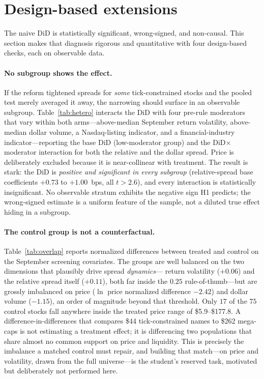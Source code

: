\documentclass[12pt]{article}
\begin{document}
\section{Design-based extensions}\label{sec:design}
The naive DiD is statistically significant, wrong-signed, and non-causal. This section makes
that diagnosis rigorous and quantitative with four design-based checks, each on observable data.

\paragraph{No subgroup shows the effect.} If the reform tightened spreads for \emph{some}
tick-constrained stocks and the pooled test merely averaged it away, the narrowing should
surface in an observable subgroup. Table~\ref{tab:hetero} interacts the DiD with four pre-rule
moderators that vary within both arms---above-median September return volatility, above-median
dollar volume, a Nasdaq-listing indicator, and a financial-industry indicator---reporting the
base DiD (low-moderator group) and the DiD$\times$moderator interaction for both the relative
and the dollar spread. Price is deliberately excluded because it is near-collinear with
treatment. The result is stark: the DiD is \emph{positive and significant in every subgroup}
(relative-spread base coefficients $+0.73$ to $+1.00$~bps, all $t>2.6$), and every interaction
is statistically insignificant. No observable stratum exhibits the negative sign H1 predicts;
the wrong-signed estimate is a uniform feature of the sample, not a diluted true effect hiding
in a subgroup.

\paragraph{The control group is not a counterfactual.} Table~\ref{tab:overlap} reports
normalized differences between treated and control on the September screening covariates. The
groups are well balanced on the two dimensions that plausibly drive spread \emph{dynamics}---
return volatility ($+0.06$) and the relative spread itself ($+0.11$), both far inside the
$0.25$ rule-of-thumb---but are grossly imbalanced on price ($\ln$ price normalized difference
$-2.42$) and dollar volume ($-1.15$), an order of magnitude beyond that threshold. Only $17$ of
the $75$ control stocks fall anywhere inside the treated price range of \$5.9--\$177.8. A
difference-in-differences that compares \$44 tick-constrained names to \$262 mega-caps is not
estimating a treatment effect; it is differencing two populations that share almost no common
support on price and liquidity. This is precisely the imbalance a matched control must repair,
and building that match---on price and volatility, drawn from the full universe---is the
student's reserved task, motivated but deliberately not performed here.
\end{document}
